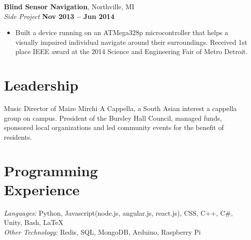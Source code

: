 \documentclass[margin,line]{resume}
\begin{document}
\begin{resume}
    \textbf{Blind Sensor Navigation}, Northville, MI \vspace{2mm}\\\vspace{1mm}%
	\textsl{Side Project} \hfill \textbf{Nov 2013 -- Jun 2014}
	\begin{itemize}
		\item Built a device running on an ATMega328p micro­controller that helps a visually impaired individual navigate around their surroundings. Received 1st place IEEE award at the 2014 Science and Engineering Fair of Metro Detroit. 
	\end{itemize}
	


   \section{\mysidestyle Leadership}
    Music Director of Maize Mirchi A Cappella, a South Asian interest a cappella group on campus. President of the Bursley Hall Council, managed funds, sponsored local organizations and led community events for the benefit of residents. 
\vspace{-2mm}

    \section{\mysidestyle Programming\\Experience}

    \emph{Languages:} Python, Javascript(node.js, angular.js, react.js), CSS, C++, C\#, Unity, Bash, \LaTeX \\
    \emph{Other Technology:} Redis, SQL, MongoDB, Arduino, Raspberry Pi
\end{resume}
\end{document}
